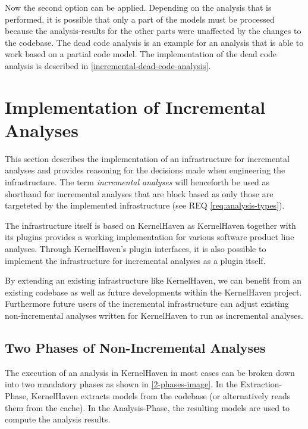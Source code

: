 \documentclass[a4paper]{article}
\begin{document}
Now the second option can be applied. Depending on the analysis that is performed, it is possible that only a part of the models must be processed because the analysis-results for the other parts were unaffected by the changes to the codebase. The dead code analysis is an example for an analysis that is able to work based on a partial code model. The implementation of the dead code analysis is described in \autoref{incremental-dead-code-analysis}.


\clearpage


\section{Implementation of Incremental Analyses}\label{implementation}

This section describes the implementation of an infrastructure for incremental analyses and provides reasoning for the decisions made when engineering the infrastructure. The term \emph{incremental analyses} will henceforth be used as shorthand for incremental analyses that are block based as only those are targeteted by the implemented infrastructure (see REQ \ref{req:analysis-types}).

The infrastructure itself is based on KernelHaven \cite{KernelHaven} as KernelHaven together with its plugins provides a working implementation for various software product line analyses. Through KernelHaven's plugin interfaces, it is also possible to implement the infrastructure for incremental analyses as a plugin itself.

By extending an existing infrastructure like KernelHaven, we can benefit from an existing codebase as well as future developments within the KernelHaven project. Furthermore future users of the incremental infrastructure can adjust existing non-incremental analyses written for KernelHaven to run as incremental analyses.

\subsection{Two Phases of Non-Incremental Analyses}\label{2-phases}

The execution of an analysis in KernelHaven in most cases can be broken down into two mandatory phases as shown in \autoref{2-phases-image}. In the Extraction-Phase, KernelHaven extracts models from the codebase  (or alternatively reads them from the cache). In the Analysis-Phase, the resulting models are used to compute the analysis results.
\end{document}
